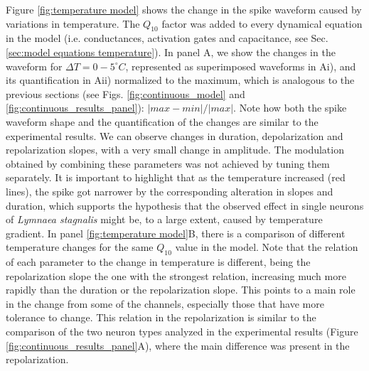 Figure \ref{fig:temperature model} shows the change in the spike waveform caused by variations in temperature. The $Q_{10}$ factor was added to every dynamical equation in the model (i.e. conductances, activation gates and capacitance, see Sec. \ref{sec:model equations temperature}). In panel A, we show the changes in the waveform for $\Delta T=0-5^{\circ}C$, represented as superimposed waveforms in Ai), and its quantification in Aii) normalized to the maximum, which is analogous to the previous sections (see Figs. \ref{fig:continuous_model} and \ref{fig:continuous_results_panel}): $|max-min|/|max|$. Note how both the spike waveform shape and the quantification of the changes are similar to the experimental results. We can observe changes in duration, depolarization and repolarization slopes, with a very small change in amplitude. The modulation obtained by combining these parameters was not achieved by tuning them separately. It is important to highlight that as the temperature increased (red lines), the spike got narrower by the corresponding alteration in slopes and duration, which supports the hypothesis that the observed effect in single neurons of \textit{Lymnaea stagnalis} might be, to a large extent, caused by temperature gradient. In panel \ref{fig:temperature model}B, there is a comparison of different temperature changes for the same $Q_{10}$ value in the model. Note that the relation of each parameter to the change in temperature is different, being the repolarization slope the one with the strongest relation, increasing much more rapidly than the duration or the repolarization slope. This points to a main role in the change from some of the channels, especially those that have more tolerance to change. This relation in the repolarization is similar to the comparison of the two neuron types analyzed in the experimental results (Figure \ref{fig:continuous_results_panel}A), where the main difference was present in the repolarization.

